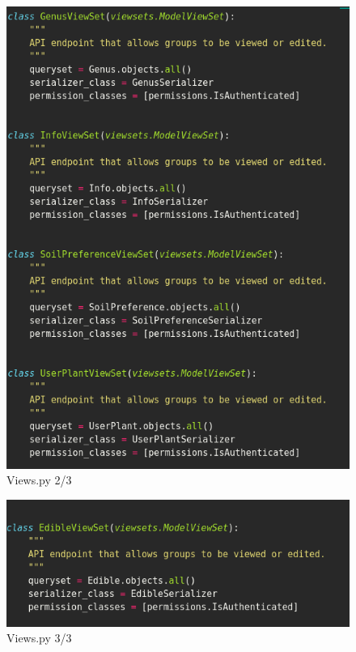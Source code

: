 \documentclass{article}
\begin{document}
     \begin{figure}[!htb]
        \centering
        \caption{Views.py 2/3}
        \includegraphics[scale=0.50]{views2}
    \end{figure}

     \begin{figure}[!htb]
        \centering
        \caption{Views.py 3/3}
        \includegraphics[scale=0.50]{views3}
    \end{figure}
   
\end{document}
